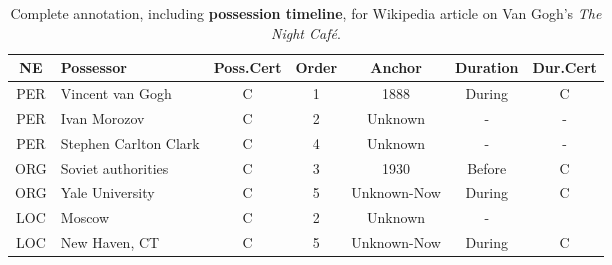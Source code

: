 \begin{table*}[t]
\centering
\begin{tabular}{c|l||c|c|c|c|c} \hline
NE & Possessor & Poss.Cert & Order & Anchor & Duration & Dur.Cert \\ \hline \hline
PER & Vincent van Gogh & C & 1 & 1888 & During &  C \\ \hline
PER & Ivan Morozov & C & 2 & Unknown & - & - \\ \hline
PER & Stephen Carlton Clark & C & 4 & Unknown & - & - \\ \hline
ORG & Soviet authorities & C & 3 & 1930 & Before & C \\ \hline
ORG & Yale University & C & 5 & Unknown-Now & During & C \\ \hline
LOC & Moscow & C & 2 & Unknown & - & \\ \hline
LOC & New Haven, CT & C & 5 & Unknown-Now & During & C \\ \hline
\end{tabular}
\caption{Complete annotation, including \textbf{possession timeline}, for Wikipedia article on Van Gogh's \textit{The Night Caf\'{e}}.} \label{tab:timeline}
\end{table*}